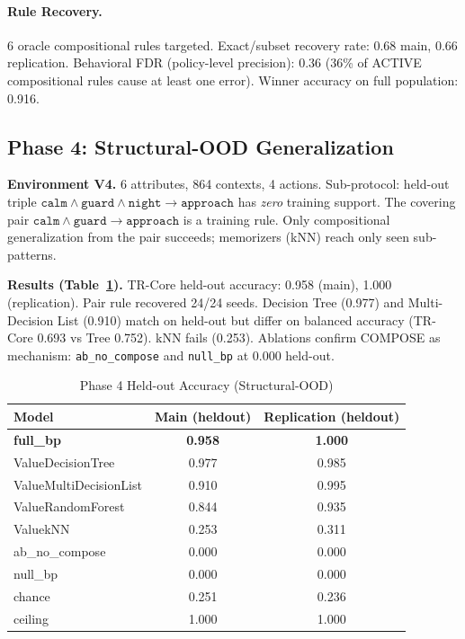 \documentclass[11pt]{article}
\begin{document}
\paragraph{Rule Recovery.} 6 oracle compositional rules targeted. Exact/subset recovery rate: 0.68 main, 0.66 replication. Behavioral FDR (policy-level precision): 0.36 (36\% of ACTIVE compositional rules cause at least one error). Winner accuracy on full population: 0.916.

\subsection{Phase 4: Structural-OOD Generalization}
\label{sec:phase4}

\textbf{Environment V4.} 6 attributes, 864 contexts, 4 actions. Sub-protocol: held-out triple $\texttt{calm} \land \texttt{guard} \land \texttt{night} \to \texttt{approach}$ has \emph{zero} training support. The covering pair $\texttt{calm} \land \texttt{guard} \to \texttt{approach}$ is a training rule. Only compositional generalization from the pair succeeds; memorizers (kNN) reach only seen sub-patterns.

\textbf{Results (Table~\ref{tab:phase4}).} TR-Core held-out accuracy: 0.958 (main), 1.000 (replication). Pair rule recovered 24/24 seeds. Decision Tree (0.977) and Multi-Decision List (0.910) match on held-out but differ on balanced accuracy (TR-Core 0.693 vs Tree 0.752). kNN fails (0.253). Ablations confirm COMPOSE as mechanism: \texttt{ab\_no\_compose} and \texttt{null\_bp} at 0.000 held-out.

\begin{table}[htbp]
\centering
\caption{Phase 4 Held-out Accuracy (Structural-OOD)}
\label{tab:phase4}
\begin{tabular}{lcc}
\toprule
Model & Main (heldout) & Replication (heldout) \\
\midrule
\textbf{full\_bp} & \textbf{0.958} & \textbf{1.000} \\
ValueDecisionTree & 0.977 & 0.985 \\
ValueMultiDecisionList & 0.910 & 0.995 \\
ValueRandomForest & 0.844 & 0.935 \\
ValuekNN & 0.253 & 0.311 \\
ab\_no\_compose & 0.000 & 0.000 \\
null\_bp & 0.000 & 0.000 \\
chance & 0.251 & 0.236 \\
ceiling & 1.000 & 1.000 \\
\bottomrule
\end{tabular}
\end{table}
\end{document}
